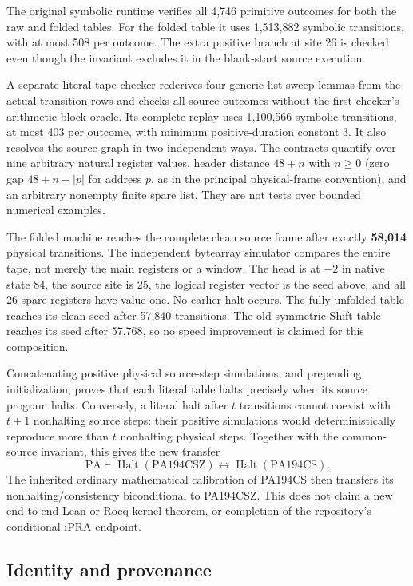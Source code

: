 The original symbolic runtime verifies all 4,746 primitive outcomes for
both the raw and folded tables. For the folded table it uses 1,513,882
symbolic transitions, with at most 508 per outcome. The extra positive
branch at site 26 is checked even though the invariant excludes it in the
blank-start source execution.

A separate literal-tape checker rederives four generic list-sweep lemmas
from the actual transition rows and checks all source outcomes without the
first checker's arithmetic-block oracle. Its complete replay uses 1,100,566
symbolic transitions, at most 403 per outcome, with minimum positive-duration
constant 3. It also resolves the source graph
in two independent ways. The contracts quantify over nine arbitrary natural
register values, header distance $48+n$ with $n\ge0$ (zero gap
$48+n-|p|$ for address $p$, as in the principal physical-frame convention),
and an arbitrary nonempty finite spare list. They are not tests over
bounded numerical examples.

The folded machine reaches the complete clean source frame after exactly
\textbf{58,014} physical transitions. The independent bytearray simulator
compares the entire tape, not merely the main registers or a window. The
head is at $-2$ in native state 84, the source site is 25, the logical
register vector is the seed above, and all 26 spare registers have value
one. No earlier halt occurs. The fully unfolded table reaches its clean
seed after 57,840 transitions. The old symmetric-Shift table reaches its
seed after 57,768, so no speed improvement is claimed for this composition.

Concatenating positive physical source-step simulations, and prepending
initialization, proves that each literal table halts precisely when its
source program halts. Conversely, a literal halt after $t$ transitions
cannot coexist with $t+1$ nonhalting source steps: their positive simulations
would deterministically reproduce more than $t$ nonhalting physical steps.
Together with the common-source invariant, this gives the new transfer
\[
 \mathrm{PA}\vdash
 \operatorname{Halt}(\mathrm{PA194CSZ})
 \longleftrightarrow
 \operatorname{Halt}(\mathrm{PA194CS}).
\]
The inherited ordinary mathematical calibration of PA194CS then transfers
its nonhalting/consistency biconditional to PA194CSZ. This does not claim a
new end-to-end Lean or Rocq kernel theorem, or completion of the repository's
conditional iPRA endpoint.

\subsection{Identity and provenance}

